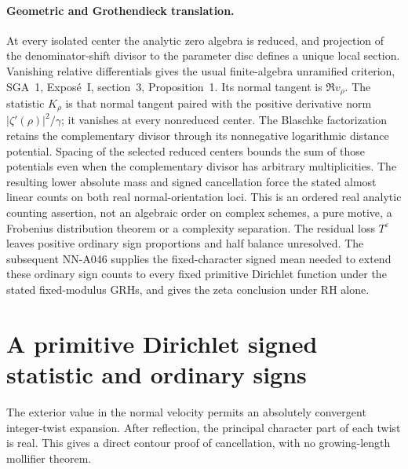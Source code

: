 \paragraph{Geometric and Grothendieck translation.}
At every isolated center the analytic zero algebra is reduced,
and projection of the denominator-shift divisor to the
parameter disc defines a unique local section. Vanishing
relative differentials gives the usual finite-algebra
unramified criterion, SGA~1, Expos\'e~I, section~3,
Proposition~1. Its normal tangent is \(\Re v_\rho\).
The statistic \(K_\rho\) is that normal tangent paired with
the positive derivative norm \(|\zeta'(\rho)|^2/\gamma\);
it vanishes at every nonreduced center.
The Blaschke factorization retains the complementary divisor
through its nonnegative logarithmic distance potential.
Spacing of the selected reduced centers bounds the sum of
those potentials even when the complementary divisor has
arbitrary multiplicities. The resulting lower absolute mass
and signed cancellation force the stated almost linear
counts on both real normal-orientation loci.
This is an ordered real analytic counting assertion, not an
algebraic order on complex schemes, a pure motive,
a Frobenius distribution theorem or a complexity separation.
The residual loss \(T^\varepsilon\) leaves positive ordinary
sign proportions and half balance unresolved.
The subsequent NN-A046 supplies the fixed-character signed
mean needed to extend these ordinary sign counts to every
fixed primitive Dirichlet function under the stated
fixed-modulus GRHs, and gives the zeta conclusion under RH alone.


\section{A primitive Dirichlet signed statistic and ordinary signs}
\label{sec:A046-dirichlet-signed}

The exterior value in the normal velocity permits an absolutely
convergent integer-twist expansion. After reflection, the
principal character part of each twist is real. This gives a
direct contour proof of cancellation, with no growing-length
mollifier theorem.

